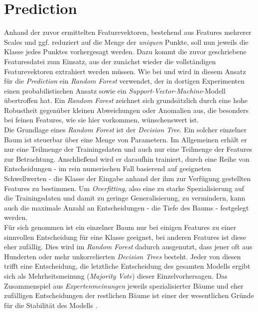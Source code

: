 
\chapter{Prediction}
\label{chap:prediction}

Anhand der zuvor ermittelten Featurevektoren, bestehend aus Features mehrerer Scales und ggf. reduziert auf die Menge der \textit{uniquen} Punkte, soll nun jeweils die Klasse jedes Punktes vorhergesagt werden. Dazu kommt die zuvor geschriebene Featuresdatei zum Einsatz, aus der zunächst wieder die vollständigen Featurevektoren extrahiert werden müssen. Wie bei \cite{Zhiqiang.etal-2019} und \cite{Li.Cheng-2018} wird in diesem Ansatz für die \textit{Prediction} ein \textit{Random Forest} verwendet, der in dortigen Experimenten einen probabilistischen Ansatz sowie ein \textit{Support-Vector-Machine}-Modell übertroffen hat. Ein \textit{Random Forest} zeichnet sich grundsätzlich durch eine hohe Robustheit gegenüber kleinen Abweichungen oder Anomalien aus, die besonders bei feinen Features, wie sie hier vorkommen, wünschenswert ist. \\
Die Grundlage eines \textit{Random Forest} ist der \textit{Decision Tree}. Ein solcher einzelner Baum ist steuerbar über eine Menge von Parametern. Im Allgemeinen erhält er nur eine Teilmenge der Trainingsdaten und auch nur eine Teilmenge der Features zur Betrachtung. Anschließend wird er daraufhin trainiert, durch eine Reihe von Entscheidungen - im rein numerischen Fall basierend auf geeigneten Schwellwerten - die Klasse der Eingabe anhand der ihm zur Verfügung gestellten Features zu bestimmen. Um \textit{Overfitting}, also eine zu starke Spezialisierung auf die Trainingsdaten und damit zu geringe Generalisierung, zu vermindern, kann auch die maximale Anzahl an Entscheidungen - die Tiefe des Baums - festgelegt werden. \\
Für sich genommen ist ein einzelner Baum nur bei einigen Features zu einer sinnvollen Entscheidung für eine Klasse geeignet, bei anderen Features ist diese eher zufällig. Dies wird im \textit{Random Forest} dadurch ausgenutzt, dass jener oft aus Hunderten oder mehr unkorrelierten \textit{Decision Trees} besteht. Jeder von diesen trifft eine Entscheidung, die letztliche Entscheidung des gesamten Modells ergibt sich als Mehrheitsmeinung (\textit{Majority Vote}) dieser Einzelvorhersagen. Das Zusammenspiel aus \textit{Expertenmeinungen} jeweils spezialisierter Bäume und eher zufälligen Entscheidungen der restlichen Bäume ist einer der wesentlichen Gründe für die Stabilität des Modells \citep{Breiman-2001}.\\
